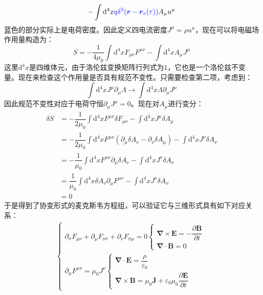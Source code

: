 \documentclass[12pt, a4paper, oneside]{ctexart}
\begin{document}
	\begin{equation}
		-\int \mathrm{d}^{4}x\textcolor{blue}{q\delta^{3}({\boldsymbol{r}-\boldsymbol{r}_{e}(\tau)})}A_{\mu}u^{\mu}
	\end{equation}
	\quad\quad 蓝色的部分实际上是电荷密度。因此定义四电流密度$J^{\mu}=\rho u^{\mu}$，现在可以将电磁场作用量构造为：
	\begin{equation}
		S=-\dfrac{1}{4\mu_{0}}\int \mathrm{d}^{4}xF_{\mu\nu}F^{\mu\nu}-\int \mathrm{d}^{4}xA_{\mu}J^{\mu}
	\end{equation}
	\quad\quad 这里$\mathrm{d}^{4}x$是四维体元，由于洛伦兹变换矩阵行列式为$1$，它也是一个洛伦兹不变量。现在来检查这个作用量是否具有规范不变性。只需要检查第二项，考虑到：
	\begin{equation}
		\int\mathrm{d}^4xJ^{\mu}\partial_{\mu}\Lambda\to\int\mathrm{d}^4x\Lambda\partial_{\mu}J^{\mu}
	\end{equation}
	\quad\quad 因此规范不变性对应于电荷守恒$\partial_{\mu}J^{\mu}=0$。现在对$A_{\mu}$进行变分：
	\begin{equation}
		\begin{aligned}
			\delta S&=-\dfrac{1}{2\mu_{0}}\int \mathrm{d}^{4}xF^{\mu\nu}\delta F_{\mu\nu}-\int \mathrm{d}^{4}xJ^{\mu}\delta A_{\mu}\\
			&=-\dfrac{1}{2\mu_{0}}\int \mathrm{d}^{4}xF^{\mu\nu}\left(\partial_{\mu}\delta A_{\nu}-\partial_{\nu}\delta A_{\mu}\right)-\int \mathrm{d}^{4}xJ^{\nu}\delta A_{\nu}\\
			&=-\dfrac{1}{\mu_{0}}\int \mathrm{d}^{4}xF^{\mu\nu}\partial_{\mu}\delta A_{\nu}-\int \mathrm{d}^{4}xJ^{\nu}\delta A_{\nu}\\
			&=\dfrac{1}{\mu_{0}}\int \mathrm{d}^{4}x\delta A_{\nu}\partial_{\mu}F^{\mu\nu}-\int \mathrm{d}^{4}xJ^{\nu}\delta A_{\nu}\\
			&=0
		\end{aligned}
	\end{equation}
	\quad\quad 于是得到了协变形式的麦克斯韦方程组，可以验证它与三维形式具有如下对应关系：
	\begin{equation}
		\begin{aligned}
		\begin{cases}\partial_{\sigma}F_{\mu\nu}+\partial_{\mu}F_{\nu\sigma}+\partial_{\nu}F_{\sigma\mu}=0\begin{cases}
				\boldsymbol{\nabla} \times \boldsymbol{E} = -\dfrac{\partial \boldsymbol{B}}{\partial t} \\
				\boldsymbol{\nabla} \cdot \boldsymbol{B} = 0 
				
			\end{cases}
			\\\partial_{\mu}F^{\mu\nu}=\mu_{0}J^{\nu}\begin{cases}\boldsymbol{\nabla} \cdot \boldsymbol{E} = \dfrac{\rho}{\varepsilon_{0}} \\
				\boldsymbol{\nabla} \times \boldsymbol{B} = \mu_{0}\boldsymbol{J}+\varepsilon_{0}\mu_{0}\dfrac{\partial \boldsymbol{E}}{\partial t}
				
			\end{cases}
			
		\end{cases}
		\end{aligned}
	\end{equation}
\end{document}
